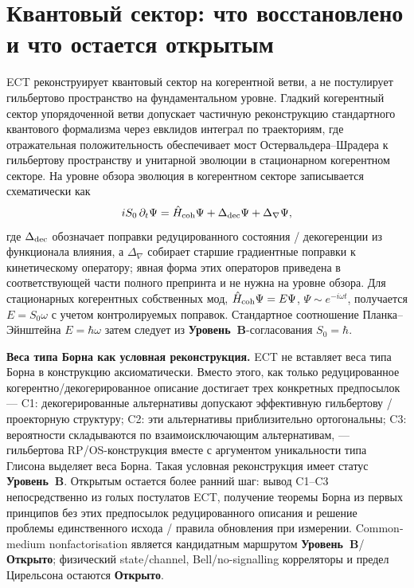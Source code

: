 \documentclass[11pt,a4paper]{article}
\newcommand{\statB}{\textbf{Уровень~B}}
\newcommand{\statO}{\textbf{Открыто}}
\begin{document}
\section{Квантовый сектор: что восстановлено и что остается открытым}
\label{sec:quantum}

ECT реконструирует квантовый сектор на когерентной ветви,
а не постулирует гильбертово пространство на фундаментальном
уровне.
Гладкий когерентный сектор упорядоченной ветви допускает
частичную реконструкцию стандартного квантового формализма через
евклидов интеграл по траекториям, где отражательная
положительность обеспечивает мост Остервальдера--Шрадера к
гильбертову
пространству и унитарной эволюции в стационарном когерентном
секторе. На уровне обзора эволюция в когерентном секторе
записывается схематически как
\begin{equation}
  \label{eq:qs}
  iS_0\,\partial_t\Psi
  = \hat H_{\rm coh}\Psi
  + \Delta_{\rm dec}\Psi
  + \Delta_{\nabla}\Psi,
\end{equation}
где $\Delta_{\rm dec}$ обозначает поправки редуцированного
состояния / декогеренции из функционала влияния, а
$\Delta_{\nabla}$ собирает старшие градиентные поправки к
кинетическому оператору; явная форма этих операторов приведена в
соответствующей части полного препринта и не нужна на уровне
обзора. Для стационарных когерентных собственных мод,
$\hat H_{\rm coh}\Psi=E\Psi$, $\Psi\sim e^{-i\omega t}$,
получается $E=S_0\omega$ с учетом контролируемых поправок.
Стандартное соотношение Планка--Эйнштейна $E=\hbar\omega$ затем
следует из \statB{}-согласования $S_0=\hbar$.

\textbf{Веса типа Борна как условная реконструкция.}
ECT не вставляет веса типа Борна в конструкцию аксиоматически.
Вместо этого, как только редуцированное
когерентно/декогерированное описание достигает трех конкретных
предпосылок — C1: декогерированные альтернативы допускают
эффективную гильбертову / проекторную структуру; C2: эти
альтернативы приблизительно ортогональны; C3: вероятности
складываются по взаимоисключающим альтернативам, — гильбертова
RP/OS-конструкция вместе с аргументом уникальности типа Глисона
выделяет веса Борна. Такая условная реконструкция имеет статус
\statB. Открытым остается более ранний шаг: вывод C1--C3
непосредственно из голых постулатов ECT, получение теоремы Борна
из первых принципов без этих предпосылок редуцированного
описания и решение проблемы единственного исхода / правила
обновления при измерении. Common-medium nonfactorisation является кандидатным маршрутом
\statB{}/\statO{}; физический state/channel, Bell/no-signalling
корреляторы и предел Цирельсона остаются \statO.
\end{document}
